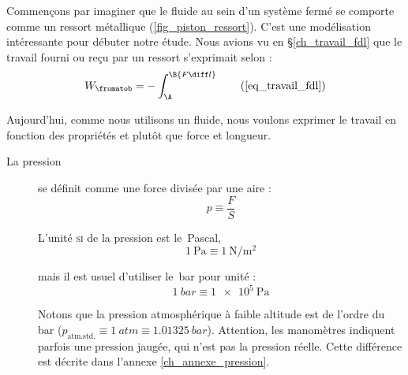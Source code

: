 		Commençons par imaginer que le fluide au sein d’un système fermé se comporte comme un ressort métallique (\cref{fig_piston_ressort}). C’est une modélisation intéressante pour débuter notre étude. Nous avions vu en \S\ref{ch_travail_fdl} que le travail fourni ou reçu par un ressort s’exprimait selon :
		\begin{equation*}
			W_\fromatob = - \int_\A^\B {F \diff l} \tag{\ref{eq_travail_fdl}}
		\end{equation*}

		Aujourd’hui, comme nous utilisons un fluide, nous voulons exprimer le travail en fonction des propriétés  et  plutôt que force et longueur.

		\clearfloats
		\begin{description}

			\item[La pression]{se définit comme une force divisée par une aire :
			\begin{equation}
				p \equiv \frac{F}{S}
				\label{def_pression}
			\end{equation}
		

			L’unité \textsc{si} de la pression est le~\si{Pascal},
			\begin{equation}
				\SI{1}{\pascal} \equiv \SI{1}{\newton\per\metre\squared}
			\end{equation}
		
			mais il est usuel d’utiliser le~\si{bar} pour unité :
			\begin{equation}
			\SI{1}{bar} \equiv \SI{1e5}{\pascal}
			\end{equation}

			Notons que la pression atmosphérique à faible altitude est de l’ordre du bar ($p_{\text{atm.std.}} \equiv \SI{1}{atm} \equiv \SI{1,01325}{bar}$). Attention, les manomètres indiquent parfois une pression jaugée, qui n’est pas la pression réelle. Cette différence est décrite dans l’annexe \ref{ch_annexe_pression}.
			}%


\end{description}
